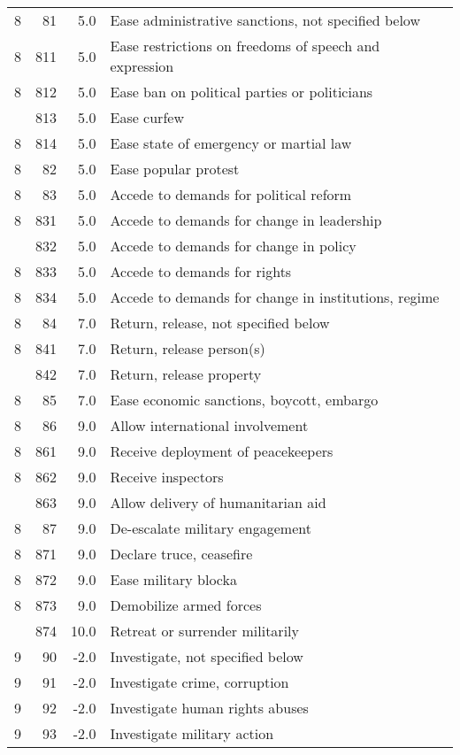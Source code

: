 \documentclass[10pt,]{article}
\begin{document}
\begin{longtable}[t]{rrrl}
8 & 81 & 5.0 & Ease administrative sanctions, not specified below\\
8 & 811 & 5.0 & Ease restrictions on freedoms of speech and expression\\
8 & 812 & 5.0 & Ease ban on political parties or politicians\\
\addlinespace
8 & 813 & 5.0 & Ease curfew\\
8 & 814 & 5.0 & Ease state of emergency or martial law\\
8 & 82 & 5.0 & Ease popular protest\\
8 & 83 & 5.0 & Accede to demands for political reform\\
8 & 831 & 5.0 & Accede to demands for change in leadership\\
\addlinespace
8 & 832 & 5.0 & Accede to demands for change in policy\\
8 & 833 & 5.0 & Accede to demands for rights\\
8 & 834 & 5.0 & Accede to demands for change in institutions, regime\\
8 & 84 & 7.0 & Return, release, not specified below\\
8 & 841 & 7.0 & Return, release person(s)\\
\addlinespace
8 & 842 & 7.0 & Return, release property\\
8 & 85 & 7.0 & Ease economic sanctions, boycott, embargo\\
8 & 86 & 9.0 & Allow international involvement\\
8 & 861 & 9.0 & Receive deployment of peacekeepers\\
8 & 862 & 9.0 & Receive inspectors\\
\addlinespace
8 & 863 & 9.0 & Allow delivery of humanitarian aid\\
8 & 87 & 9.0 & De-escalate military engagement\\
8 & 871 & 9.0 & Declare truce, ceasefire\\
8 & 872 & 9.0 & Ease military blocka\\
8 & 873 & 9.0 & Demobilize armed forces\\
\addlinespace
8 & 874 & 10.0 & Retreat or surrender militarily\\
9 & 90 & -2.0 & Investigate, not specified below\\
9 & 91 & -2.0 & Investigate crime, corruption\\
9 & 92 & -2.0 & Investigate human rights abuses\\
9 & 93 & -2.0 & Investigate military action\\

\end{longtable}
\end{document}
